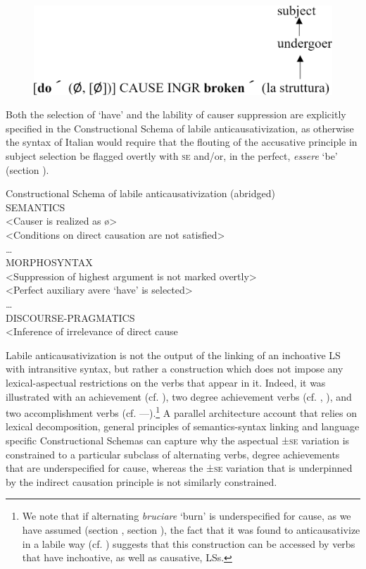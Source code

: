 \documentclass[output=paper,colorlinks,citecolor=brown
]{langscibook}
\begin{document}
\begin{figure}
\centering
\includegraphics[width=2\textwidth]{figures/bentley_figure4.png}
\caption{}
\label{fig:bentley_figure_4}
\end{figure}    

Both the selection of ‘have’ and the lability of causer suppression are explicitly specified in the Constructional Schema of labile anticausativization, as otherwise the syntax of Italian would require that the flouting of the accusative principle in subject selection be flagged overtly with \textsc{se} and/or, in the perfect, \textit{essere} ‘be’ (section ).

\ea  \label{bentley_example_60}
Constructional Schema of labile anticausativization (abridged)\\
SEMANTICS\\
<Causer is realized as \o>\\
<Conditions on direct causation are not satisfied>\\
 \ldots \\
MORPHOSYNTAX\\
<Suppression of highest argument is not marked overtly>\\
<Perfect auxiliary avere ‘have’ is selected>\\
 \ldots \\
DISCOURSE-PRAGMATICS\\
<Inference of irrelevance of direct cause
\z

Labile anticausativization is not the output of the linking of an inchoative LS with intransitive syntax, but rather a construction which does not impose any lexical-aspectual restrictions on the verbs that appear in it. Indeed, it was illustrated with an achievement (cf. ), two degree achievement verbs (cf. , ), and two accomplishment verbs (cf. —).\footnote{We note that if alternating \textit{bruciare} ‘burn’ is underspecified for cause, as we have assumed (section , section ), the fact that it was found to anticausativize in a labile way (cf. ) suggests that this construction can be accessed by verbs that have inchoative, as well as causative, LSs.}  A parallel architecture account that relies on lexical decomposition, general principles of semantics-syntax linking and language specific Constructional Schemas can capture why the aspectual ±\textsc{se} variation is constrained to a particular subclass of alternating verbs, degree achievements that are underspecified for cause, whereas the ±\textsc{se} variation that is underpinned by the indirect causation principle is not similarly constrained.  
\end{document}
